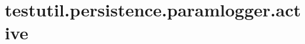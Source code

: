 \section{testutil.persistence.paramlogger.active}
\label{configuration:TestutilPersistenceParamloggerActive}
\TODO

